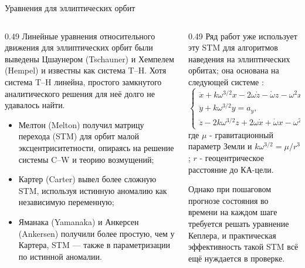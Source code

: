 \documentclass[8pt]{beamer}
\begin{document}
\begin{frame}{Уравнения для эллиптических орбит}
\begin{columns}[T,totalwidth=\textwidth]
  \begin{column}{0.49\textwidth}
    Линейные уравнения относительного движения для эллиптических орбит были выведены Цшаунером (Tschauner) и Хемпелем (Hempel) и известны как система T–H. Хотя система T–H линейна, простого замкнутого аналитического решения для неё долго не удавалось найти. 
    \begin{itemize}
        \item Мелтон (Melton) \cite{melton2000time} получил матрицу перехода (STM) для орбит малой эксцентриситетности, опираясь на решение системы C–W и теорию возмущений;
        \item Картер (Carter) \cite{carter1998state} вывел более сложную STM, используя истинную аномалию как независимую переменную;
        \item Яманака (Yamanaka) и Анкерсен (Ankersen) \cite{yamanaka2002new} получили более простую, чем у Картера, STM — также в параметризации по истинной аномалии.
    \end{itemize}
  \end{column}

  \begin{column}{0.49\textwidth}
  Ряд работ уже использует эту STM для алгоритмов наведения на эллиптических орбитах; она основана на следующей системе \cite{yamanaka2002new}:
    \begin{equation*}
        \begin{cases}
            \ddot{x} + k \omega^{3/2} x - 2 \omega \dot{z} - \dot{\omega} z - \omega^2 x = a_x, \\
            \ddot{y} + k \omega^{3/2} y = a_y, \\
            \ddot{z} - 2 k \omega^{3/2} z + 2 \omega \dot{x} + \dot{\omega} x - \omega^2 z = a_z,
        \end{cases}
    \end{equation*}
    где $\mu$ - гравитационный параметр Земли и $k \omega^{3/2} = \mu / r^3$; $r$ - геоцентрическое расстояние до КА-цели.

    Однако при пошаговом прогнозе состояния во времени на каждом шаге требуется решать уравнение Кеплера, и практическая эффективность такой STM всё ещё нуждается в проверке.
  \end{column}
\end{columns}
\end{frame}
\end{document}
